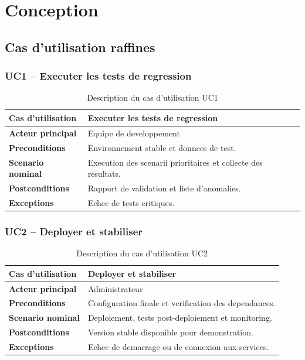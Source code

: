 \documentclass[a4paper,12pt]{report}
\begin{document}
\section{Conception}

\subsection{Cas d'utilisation raffines}

\subsubsection{UC1 -- Executer les tests de regression}
\begin{table}[H]
  \centering
  \caption{Description du cas d'utilisation UC1}
  \begin{tabularx}{\textwidth}{>{\bfseries}p{4cm} X}
    \toprule
    Cas d'utilisation & Executer les tests de regression \\
    \midrule
    Acteur principal & Equipe de developpement \\
    Preconditions & Environnement stable et donnees de test. \\
    Scenario nominal & Execution des scenarii prioritaires et collecte des resultats. \\
    Postconditions & Rapport de validation et liste d'anomalies. \\
    Exceptions & Echec de tests critiques. \\
    \bottomrule
  \end{tabularx}
\end{table}

\subsubsection{UC2 -- Deployer et stabiliser}
\begin{table}[H]
  \centering
  \caption{Description du cas d'utilisation UC2}
  \begin{tabularx}{\textwidth}{>{\bfseries}p{4cm} X}
    \toprule
    Cas d'utilisation & Deployer et stabiliser \\
    \midrule
    Acteur principal & Administrateur \\
    Preconditions & Configuration finale et verification des dependances. \\
    Scenario nominal & Deploiement, tests post-deploiement et monitoring. \\
    Postconditions & Version stable disponible pour demonstration. \\
    Exceptions & Echec de demarrage ou de connexion aux services. \\
    \bottomrule
  \end{tabularx}
\end{table}
\end{document}
